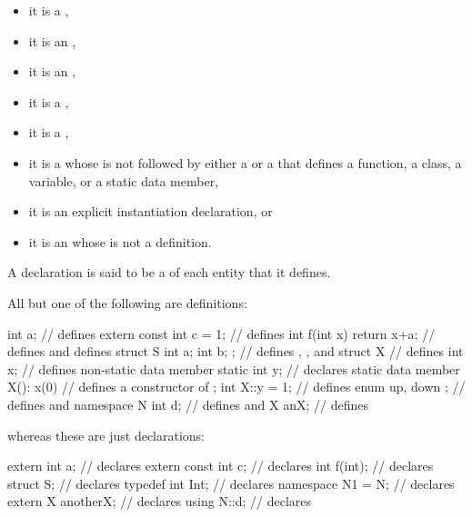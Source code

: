 \begin{itemize}
a ,
\item it is
a ,
\item
it is an
,
\item
it is an
,
\item it is
a ,
\item it is
a ,
\item it is
a 
whose  is not followed by
either a  or a 
that defines a function, a class, a variable, or a static data member,
\item it is
an explicit instantiation declaration, or
\item it is
an  whose
 is not a definition.
\end{itemize}
A declaration is said to be a  of each entity that it defines.
\begin{example}
All but one of the following are definitions:
\begin{codeblock}
int a;                          // defines 
extern const int c = 1;         // defines 
int f(int x) { return x+a; }    // defines  and defines 
struct S { int a; int b; };     // defines , , and 
struct X {                      // defines 
  int x;                        // defines non-static data member 
  static int y;                 // declares static data member 
  X(): x(0) { }                 // defines a constructor of 
};
int X::y = 1;                   // defines 
enum { up, down };              // defines  and 
namespace N { int d; }          // defines  and 
X anX;                          // defines 

\end{codeblock}
whereas these are just declarations:
\begin{codeblock}
extern int a;                   // declares 
extern const int c;             // declares 
int f(int);                     // declares 
struct S;                       // declares 
typedef int Int;                // declares 
namespace N1 = N;               // declares 
extern X anotherX;              // declares 
using N::d;                     // declares 
\end{codeblock}
\end{example}

